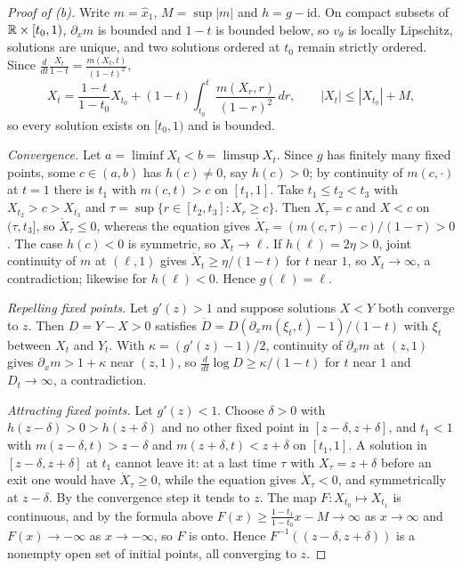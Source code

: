\documentclass{article} %
\theoremstyle{plain}
\theoremstyle{definition}
\theoremstyle{remark}
\begin{document}
\begin{proof}[Proof of (b)]
Write $m=\hat x_1$, $M=\sup|m|$ and $h=g-\mathrm{id}$. On compact subsets of $\mathbb{R}\times[t_0,1)$,
$\partial_xm$ is bounded and $1-t$ is bounded below, so $v_\theta$ is locally Lipschitz, solutions
are unique, and two solutions ordered at $t_0$ remain strictly ordered. Since
$\frac{d}{dt}\frac{X_t}{1-t}=\frac{m(X_t,t)}{(1-t)^2}$,
\[
X_t=\frac{1-t}{1-t_0}X_{t_0}+(1-t)\int_{t_0}^t\frac{m(X_r,r)}{(1-r)^2}\,dr,
\qquad |X_t|\le|X_{t_0}|+M,
\]
so every solution exists on $[t_0,1)$ and is bounded.

\emph{Convergence.} Let $a=\liminf X_t<b=\limsup X_t$. Since $g$ has finitely many fixed points,
some $c\in(a,b)$ has $h(c)\ne0$, say $h(c)>0$; by continuity of $m(c,\cdot)$ at $t=1$ there is $t_1$
with $m(c,t)>c$ on $[t_1,1]$. Take $t_1\le t_2<t_3$ with $X_{t_2}>c>X_{t_3}$ and
$\tau=\sup\{r\in[t_2,t_3]:X_r\ge c\}$. Then $X_\tau=c$ and $X<c$ on $(\tau,t_3]$, so
$\dot X_\tau\le0$, whereas the equation gives $\dot X_\tau=(m(c,\tau)-c)/(1-\tau)>0$. The case
$h(c)<0$ is symmetric, so $X_t\to\ell$. If $h(\ell)=2\eta>0$, joint continuity of $m$ at $(\ell,1)$
gives $\dot X_t\ge\eta/(1-t)$ for $t$ near $1$, so $X_t\to\infty$, a contradiction; likewise for
$h(\ell)<0$. Hence $g(\ell)=\ell$.

\emph{Repelling fixed points.} Let $g'(z)>1$ and suppose solutions $X<Y$ both converge to $z$. Then
$D=Y-X>0$ satisfies $\dot D=D(\partial_xm(\xi_t,t)-1)/(1-t)$ with $\xi_t$ between $X_t$ and $Y_t$.
With $\kappa=(g'(z)-1)/2$, continuity of $\partial_xm$ at $(z,1)$ gives $\partial_xm>1+\kappa$
near $(z,1)$, so $\frac{d}{dt}\log D\ge\kappa/(1-t)$ for $t$ near $1$ and $D_t\to\infty$, a
contradiction.

\emph{Attracting fixed points.} Let $g'(z)<1$. Choose $\delta>0$ with $h(z-\delta)>0>h(z+\delta)$
and no other fixed point in $[z-\delta,z+\delta]$, and $t_1<1$ with $m(z-\delta,t)>z-\delta$ and
$m(z+\delta,t)<z+\delta$ on $[t_1,1]$. A solution in $[z-\delta,z+\delta]$ at $t_1$ cannot leave it:
at a last time $\tau$ with $X_\tau=z+\delta$ before an exit one would have $\dot X_\tau\ge0$, while
the equation gives $\dot X_\tau<0$, and symmetrically at $z-\delta$. By the convergence step it
tends to $z$. The map $F:X_{t_0}\mapsto X_{t_1}$ is continuous, and by the formula above
$F(x)\ge\frac{1-t_1}{1-t_0}x-M\to\infty$ as $x\to\infty$ and $F(x)\to-\infty$ as $x\to-\infty$, so
$F$ is onto. Hence $F^{-1}((z-\delta,z+\delta))$ is a nonempty open set of initial points, all
converging to $z$.
\end{proof}
\end{document}
